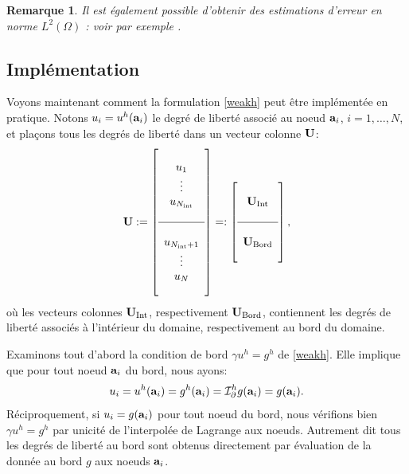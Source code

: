 \documentclass[11pt]{book}
\newtheorem{remark}[theorem]{Remarque}
\newcommand{\br}{\begin{remark}}
\newcommand{\er}{\end{remark}}
\def\a{{\bf a}}
\def\U{{\bf U}}
\newcommand{\caI}{{\cal I}}
\newcommand{\caT}{{\cal T}}
\begin{document}
\br
Il est également possible d'obtenir des estimations d'erreur en norme $L^2(\Omega)$ : voir par exemple \cite[Corollary 3.29]{ern-guermond-04}.
\er

\subsection{Implémentation}

Voyons maintenant comment la formulation \eqref{weakh} peut être implémentée en pratique. 
Notons $u_i = u^h(\a_i)$ le degré de liberté associé au noeud $\a_i$, $i=1,\ldots,N$, et plaçons tous les degrés de liberté dans un vecteur colonne $\U$:
\[
 \U := \left [ \begin{array}{c} \\ u_1 \\ \vdots \\ u_{N_{\mathrm{int}}} \\ \\ 
 \hline \\ u_{N_{\mathrm{int}}+1} \\ \vdots \\ u_{N} \\ \\ \end{array} \right ]
 =: \left [ \begin{array}{c} \\ \U_{\mathrm{Int}} \\ \\ \hline \\ \U_{\mathrm{Bord}} \\ \\ \end{array} \right ],
\]
où les vecteurs colonnes $\U_{\mathrm{Int}}$, respectivement $\U_{\mathrm{Bord}}$, contiennent les degrés de liberté associés à l'intérieur du domaine, respectivement au bord du domaine.

Examinons tout d'abord la condition de bord $\gamma u^h = g^h$ de \eqref{weakh}. Elle implique que pour tout noeud $\a_i$ du bord, nous ayons:
\[
 u_i = u^h (\a_i) = g^h (\a_i) = \caI^h_\partial g (\a_i) =  g (\a_i).
\]
Réciproquement, si $u_i = g (\a_i)$ pour tout noeud du bord, nous vérifions bien $\gamma u^h = g^h$ par unicité de l'interpolée de Lagrange aux noeuds.
Autrement dit tous les degrés de liberté au bord sont obtenus directement par évaluation de la donnée au bord $g$ aux noeuds $\a_i$.
\end{document}
